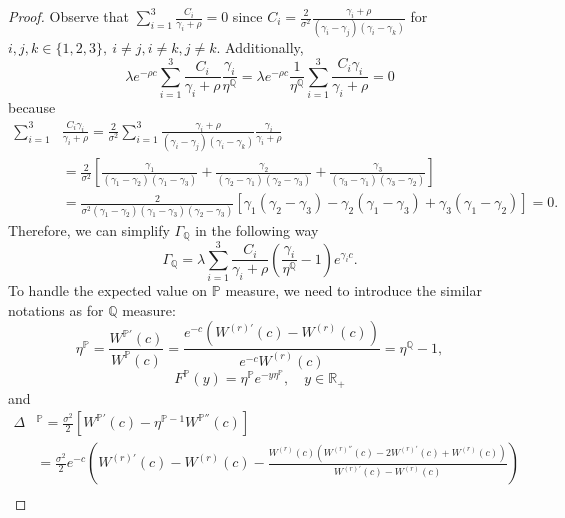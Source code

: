 \documentclass[10pt]{amsart}
\def\P{{\mathbb{P}}}
\def\Q{{\mathbb{Q}}}
\def\P{{\mathbb P}} \def\le{\left} \def\ri{\right} \def\i{\infty}
\begin{document}
\begin{proof}
			Observe that $\sum_{i=1}^3 \frac{C_i}{\gamma_i+\rho}=0$ since $C_i = \frac{2}{\sigma^2} \frac{\gamma_i + \rho}{(\gamma_i-\gamma_j)(\gamma_i-\gamma_k)}$ for $i,j,k \in \{1,2,3\},\ i\neq j, i\neq k, j\neq k$.
			Additionally,
			\begin{equation}\label{sum_Ci_0}
				\lambda e^{-\rho c} \sum_{i=1}^{3} \frac{C_i}{\gamma_i+\rho} \frac{\gamma_i}{\eta^\Q} = \lambda e^{-\rho c} \frac{1}{\eta^\Q}\sum_{i=1}^{3} \frac{C_i \gamma_i}{\gamma_i + \rho} = 0
			\end{equation}
			because
			\begin{align*}
				\sum_{i=1}^{3} &\frac{C_i \gamma_i}{\gamma_i + \rho} = \frac{2}{\sigma^2}\sum_{i=1}^{3} \frac{\gamma_i + \rho}{(\gamma_i-\gamma_j)(\gamma_i-\gamma_k)} \frac{\gamma_i}{\gamma_i + \rho} \\
				\nonumber	&= \frac{2}{\sigma^2} \left[ \frac{\gamma_1}{(\gamma_1-\gamma_2)(\gamma_1-\gamma_3)} + \frac{\gamma_2}{(\gamma_2-\gamma_1)(\gamma_2-\gamma_3)} + \frac{\gamma_3}{(\gamma_3-\gamma_1)(\gamma_3-\gamma_2)} \right] \\
				\nonumber	&= \frac{2}{\sigma^2(\gamma_1-\gamma_2)(\gamma_1-\gamma_3)(\gamma_2-\gamma_3)} [ \gamma_1(\gamma_2-\gamma_3) - \gamma_2(\gamma_1-\gamma_3) + \gamma_3(\gamma_1-\gamma_2) ] = 0.
			\end{align*}
			Therefore, we can simplify $\Gamma_\Q$ in the following way
			\begin{equation}\label{def_Gamma}
				\Gamma_\Q =	\lambda  \sum_{i=1}^3 \frac{C_i}{\gamma_i + \rho} \left( \frac{\gamma_i}{\eta^\Q} - 1\right)e^{\gamma_i c}.
			\end{equation}
			To handle the expected value on $\P$ measure, we need to introduce the similar notations as for $\Q$ measure:
			\begin{equation*}
				\eta^\P = \frac{W^{\P'}(c)}{W^{\P}(c)} = \frac{e^{-c}\left( W^{(r)'}(c) - W^{(r)}(c) \right)}{e^{-c}W^{(r)}(c)} = \eta^\Q - 1,
			\end{equation*}
			\begin{equation*}
				F^\P(y) = \eta^\P e^{-y\eta^\P},\quad y \in \mathbb{R}_+
			\end{equation*}
			and
			\begin{align*}
				\Delta&^\P = \frac{\sigma^2}{2}\left[ W^{\P'}(c) - \eta^{\P-1}W^{\P''}(c) \right] \\
				\nonumber &= \frac{\sigma^2}{2} e^{-c} \left( W^{(r)'}(c) - W^{(r)}(c) - \frac{W^{(r)}(c)\left( W^{(r)''}(c) - 2W^{(r)'}(c) + W^{(r)}(c) \right)}{W^{(r)'}(c) - W^{(r)}(c)} \right) \\

\end{align*}
\end{proof}
\end{document}
